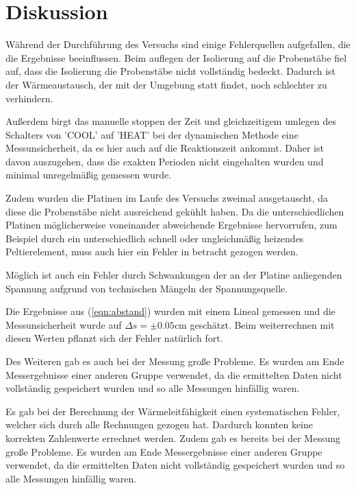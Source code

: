 \newpage
\section{Diskussion}
Während der Durchführung des Versuchs sind einige Fehlerquellen aufgefallen, die die Ergebnisse beeinflussen.
Beim auflegen der Isolierung auf die Probenstäbe fiel auf, dass die Isolierung die Probenstäbe nicht vollständig bedeckt.
Dadurch ist der Wärmeaustausch, der mit der Umgebung statt findet, noch schlechter zu verhindern.

\noindent Außerdem birgt das manuelle stoppen der Zeit und gleichzeitigem umlegen des Schalters von 'COOL' auf 'HEAT' bei der dynamischen Methode eine Messunsicherheit, 
da es hier auch auf die Reaktionszeit ankommt.
Daher ist davon auszugehen, dass die exakten Perioden nicht eingehalten wurden und minimal unregelmäßig gemessen wurde.

\noindent Zudem wurden die Platinen im Laufe des Versuchs zweimal ausgetauscht, da diese die Probenstäbe nicht ausreichend gekühlt haben.
Da die unterschiedlichen Platinen möglicherweise voneinander abweichende Ergebnisse hervorrufen, 
zum Beispiel durch ein unterschiedlich schnell oder ungleichmäßig heizendes Peltierelement, muss auch hier ein Fehler in betracht gezogen werden.

\noindent Möglich ist auch ein Fehler durch Schwankungen der an der Platine anliegenden Spannung aufgrund von technischen Mängeln der Spannungsquelle.

\noindent Die Ergebnisse aus (\ref{eqn:abstand})
wurden mit einem Lineal gemessen und die Messunsicherheit wurde auf $\Delta s=\pm 0.05 \si{\centi\meter}$ geschätzt.
Beim weiterrechnen mit diesen Werten pflanzt sich der Fehler natürlich fort.

\noindent
Des Weiteren gab es auch bei der Messung große Probleme.
Es wurden am Ende Messergebnisse einer anderen Gruppe verwendet, da die ermittelten Daten nicht vollständig gespeichert wurden und so alle Messungen hinfällig waren. 

\label{sec:Diskussion}
\noindent
Es gab bei der Berechnung der Wärmeleitfähigkeit einen systematischen Fehler, welcher sich durch alle Rechnungen gezogen hat. Dardurch konnten keine korrekten Zahlenwerte errechnet werden.
\noindent
Zudem gab es bereits bei der Messung große Probleme. Es wurden am Ende Messergebnisse einer anderen Gruppe verwendet, da die ermittelten Daten nicht vollständig gespeichert wurden und so 
alle Messungen hinfällig waren.